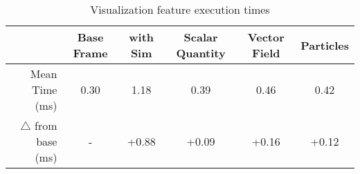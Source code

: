 \begin{table}
    \centering
    \begin{tabular}{|r|S[table-format=1.2,retain-explicit-plus]|S[table-format=1.2,retain-explicit-plus]|S[table-format=1.2,retain-explicit-plus]|S[table-format=1.2,retain-explicit-plus]|S[table-format=1.2,retain-explicit-plus]|}
    \hline
        & {Base Frame} & {with Sim} & {Scalar Quantity} & {Vector Field} & {Particles} \\ 
    \hline
        Mean Time (\si{\milli\second}) & 0.30 & 1.18 & 0.39 & 0.46 & 0.42 \\
        $\triangle$ from base (\si{\milli\second}) & {-} & +0.88 & +0.09 & +0.16 & +0.12 \\ 
    \hline
    \end{tabular}
    \caption{Visualization feature execution times}
    \label{tab:results:viz:speed}
\end{table}
